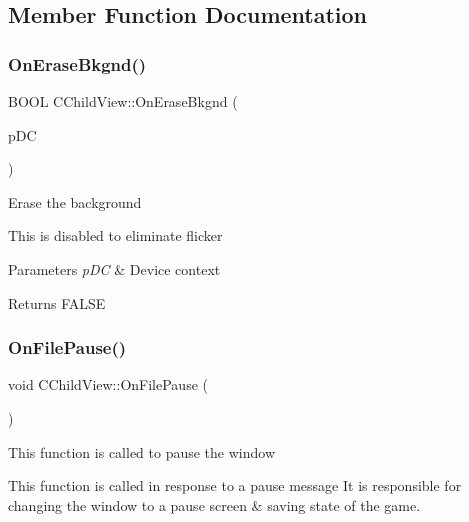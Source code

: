 \subsection{Member Function Documentation}
\mbox{\label{class_c_child_view_a6060e6d09d522d345dcee5a01d41c1f0}} 
\subsubsection{\texorpdfstring{OnEraseBkgnd()}{OnEraseBkgnd()}}
{\footnotesize\ttfamily B\+O\+OL C\+Child\+View\+::\+On\+Erase\+Bkgnd (\begin{DoxyParamCaption}\item[{C\+DC $\ast$}]{p\+DC }\end{DoxyParamCaption})}

Erase the background

This is disabled to eliminate flicker 
\begin{DoxyParams}{Parameters}
{\em p\+DC} & Device context \\
\hline
\end{DoxyParams}
\begin{DoxyReturn}{Returns}
F\+A\+L\+SE 
\end{DoxyReturn}
\mbox{\label{class_c_child_view_aa6859229c37062c75e80ffc41aaeb2dd}} 
\subsubsection{\texorpdfstring{OnFilePause()}{OnFilePause()}}
{\footnotesize\ttfamily void C\+Child\+View\+::\+On\+File\+Pause (\begin{DoxyParamCaption}{ }\end{DoxyParamCaption})}

This function is called to pause the window

This function is called in response to a pause message It is responsible for changing the window to a pause screen \& saving state of the game. \mbox{\label{class_c_child_view_af513a57c45ce8b9dcc09dd934e228534}} 
